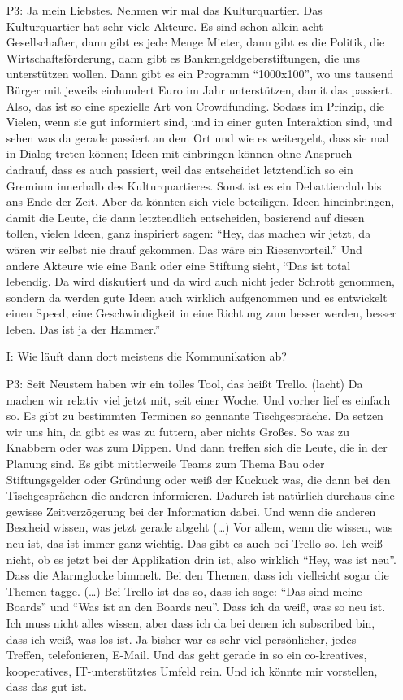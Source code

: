 \begin{itemize}
    \item[P3:] Ja mein Liebstes. Nehmen wir mal das Kulturquartier. Das Kulturquartier hat sehr viele Akteure. Es sind schon allein acht Gesellschafter, dann gibt es jede Menge Mieter, dann gibt es die Politik, die Wirtschaftsf{\"o}rderung, dann gibt es Bankengeldgeberstiftungen, die uns unterst{\"u}tzen wollen. Dann gibt es ein Programm "`1000x100"', wo uns tausend B{\"u}rger mit jeweils einhundert Euro im Jahr unterst{\"u}tzen, damit das passiert. Also, das ist so eine spezielle Art von Crowdfunding. Sodass im Prinzip, die Vielen, wenn sie gut informiert sind, und in einer guten Interaktion sind, und sehen was da gerade passiert an dem Ort und wie es weitergeht, dass sie mal in Dialog treten k{\"o}nnen; Ideen mit einbringen k{\"o}nnen ohne Anspruch dadrauf, dass es auch passiert, weil das entscheidet letztendlich so ein Gremium innerhalb des Kulturquartieres. Sonst ist es ein Debattierclub bis ans Ende der Zeit. Aber da k{\"o}nnten sich viele beteiligen, Ideen hineinbringen, damit die Leute, die dann letztendlich entscheiden, basierend auf diesen tollen, vielen Ideen, ganz inspiriert sagen: "`Hey, das machen wir jetzt, da w{\"a}ren wir selbst nie drauf gekommen. Das w{\"a}re ein Riesenvorteil."' Und andere Akteure wie eine Bank oder eine Stiftung sieht, "`Das ist total lebendig. Da wird diskutiert und da wird auch nicht jeder Schrott genommen, sondern da werden gute Ideen auch wirklich aufgenommen und es entwickelt einen Speed, eine Geschwindigkeit in eine Richtung zum besser werden, besser leben. Das ist ja der Hammer."'
    \item[I:] Wie l{\"a}uft dann dort meistens die Kommunikation ab?
    \item[P3:] Seit Neustem haben wir ein tolles Tool, das hei{\ss}t Trello. (lacht) Da machen wir relativ viel jetzt mit, seit einer Woche. Und vorher lief es einfach so. Es gibt zu bestimmten Terminen so gennante Tischgespr{\"a}che. Da setzen wir uns hin, da gibt es was zu futtern, aber nichts Gro{\ss}es. So was zu Knabbern oder was zum Dippen. Und dann treffen sich die Leute, die in der Planung sind. Es gibt mittlerweile Teams zum Thema Bau oder Stiftungsgelder oder Gr{\"u}ndung oder wei{\ss} der Kuckuck was, die dann bei den Tischgespr{\"a}chen die anderen informieren. Dadurch ist nat{\"u}rlich durchaus eine gewisse Zeitverz{\"o}gerung bei der Information dabei. Und wenn die anderen Bescheid wissen, was jetzt gerade abgeht (\dots) Vor allem, wenn die wissen, was neu ist, das ist immer ganz wichtig. Das gibt es auch bei Trello so. Ich wei{\ss} nicht, ob es jetzt bei der Applikation drin ist, also wirklich "`Hey, was ist neu"'. Dass die Alarmglocke bimmelt. Bei den Themen, dass ich vielleicht sogar die Themen tagge. (\dots) Bei Trello ist das so, dass ich sage: "`Das sind meine Boards"' und "`Was ist an den Boards neu"'. Dass ich da wei{\ss}, was so neu ist. Ich muss nicht alles wissen, aber dass ich da bei denen ich subscribed bin, dass ich wei{\ss}, was los ist. Ja bisher war es sehr viel pers{\"o}nlicher, jedes Treffen, telefonieren, E-Mail. Und das geht gerade in so ein co-kreatives, kooperatives, IT-unterst{\"u}tztes Umfeld rein. Und ich k{\"o}nnte mir vorstellen, dass	das gut ist.

\end{itemize}
